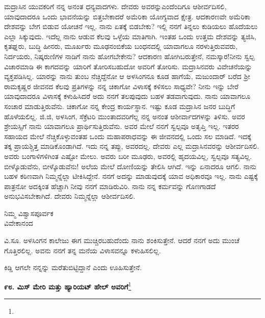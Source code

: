 ಮದ್ರಾಸಿನ ಯುವಕರಿಗೆ ನನ್ನ ಅನಂತ ಧನ್ಯವಾದಗಳು. ದೇವರು ಅವರನ್ನು\break ಎಂದೆಂದಿಗೂ ಆಶೀರ್ವದಿಸಲಿ, ಯಾವುದಾದರೂ ಒಂದು ಭಾವನೆಯನ್ನು ಬಿತ್ತಬೇಕಾದರೆ ಅಮೆರಿಕಾ ಯೋಗ್ಯವಾದ ಕ್ಷೇತ್ರ. ಆದಕಾರಣವೇ ಅಮೆರಿಕಾ ದೇಶವನ್ನು ಬೇಗ ಬಿಡುವ ಯೋಚನೆ ಇಲ್ಲ. ನಾನು ಏತಕ್ಕೆ ಬಿಡಬೇಕು? ಇಲ್ಲಿ ನನಗೆ ತಿನ್ನಲು ಕುಡಿಯಲು ಹೊದೆಯಲು ಎಲ್ಲಾ ಸಿಕ್ಕುವುದು. ಇದೆಲ್ಲ ನಾನು ಆಡುವ ಕೆಲವು ಒಳ್ಳೆಯ ಮಾತಿಗಾಗಿ. ಇಂತಹ ಒಂದು ಉತ್ತಮ ದೇಶವನ್ನು ತ್ಯಜಿಸಿ, ಕೃತಘ್ನರು, ಬುದ್ಧಿ ಹೀನರು, ಮೂರ್ಖರು ಮೂಢನಂಬಿಕೆಯ ಬಂಧನದಲ್ಲಿ ಯಾವಾಗಲೂ ನರಳುತ್ತಿರುವವರು, ನಿರ್ದಯರು, ನಿಷ್ಕರುಣಿಗಳ ನಾಡಿಗೆ ನಾನು ಹೋಗಬೇಕೇನು? ಆದಕಾರಣ ಹೋಗಿಬರುತ್ತೇನೆ, ನಮಸ್ಕಾರ!ನೀನು ಸ್ವಲ್ಪ ವಿಚಾರಮಾಡಿ ಈ ಕಾಗದವನ್ನು ಯಾರಿಗೆ ತೋರಿಸಬಹುದೋ ಅವರಿಗೆ ತೋರಿಸು. ಮದ್ರಾಸಿನವರು ವಿವೇಚನೆಯನ್ನು ವ್ಯಕ್ತಪಡಿಸಿಲ್ಲ. ಯಾರನ್ನು ನಾನು ತುಂಬ ನೆಚ್ಚಿದ್ದೆನೋ ಆ ಅಳಸಿಂಗನೂ ಕೂಡ ಹಾಗೆಯೆ, ಮಜುಂದಾರ್ ಬರೆದ ಶ‍್ರೀ ರಾಮಕೃಷ್ಣರ ಜೀವನದ ಕೆಲವು ಪ್ರತಿಗಳನ್ನು ನನ್ನ ಚಿಕಾಗೋ ವಿಳಾಸಕ್ಕೆ ಕಳಿಸಲು ಸಾಧ್ಯವೇ? ನೀನು ಇನ್ನು ಬೇರೆ ಯಾವುದಾದರೂ ವಿಳಾಸಕ್ಕೆ ಕಳುಹಿಸಿದರೆ ಅದು ನನಗೆ ತಲಪುವುದು ಬಹಳ ತಡವಾಗುವುದು. ನಾನು ಯಾವಾಗಲೂ ಸಂಚಾರ ಮಾಡುತ್ತಿರುವೆನು. ಚಿಕಾಗೋ ನನ್ನ ಕೇಂದ್ರ ಕಾರ್ಯಸ್ಥಾನ. ಇಷ್ಟು ಕೂಡ ಮದ್ರಾಸಿನ ಜನರ ಬುದ್ಧಿಗೆ ಹೊಳೆಯಲಿಲ್ಲ. ಜಿ.ಜಿ, ಅಳಸಿಂಗ, ಸೆಕ್ರೆಟರಿ ಮುಂತಾದವರಿಗೆಲ್ಲ ನನ್ನ ಅನಂತ ಆಶೀರ್ವಾದಗಳನ್ನು ತಿಳಿಸು. ಅವರ ಶ್ರೇಯಸ್ಸಿಗೆ ನಾನು ಯಾವಾಗಲೂ ಪ್ರಾರ್ಥಿಸುತ್ತಿರುವೆನು. ಅವರ ಮೇಲೆ ನನಗೆ ಸ್ವಲ್ಪವೂ ಅತೃಪ್ತಿ ಇಲ್ಲ. ಇತರರ ಸಹಾಯದ ಮೇಲೆ ನೆಚ್ಚಿಕೊಳ್ಳುವಂತಹ ಒಂದು ಮಹಾಪರಾಧವನ್ನು ಈ ಜೀವನದಲ್ಲಿ ಒಂದು ಸಲ ಮಾಡಿದೆ. ಇದಕ್ಕೆ ತಕ್ಕ ಪ್ರಾಯಶ್ಚಿತ್ತ ಮಾಡಿಕೊಂಡಾಗಿದೆ. ಇದು ನನ್ನ ತಪ್ಪು, ಅವರದಲ್ಲ. ದೇವರು ಎಲ್ಲ ಮದ್ರಾಸಿನವರನ್ನು ಆಶೀರ್ವದಿಸಲಿ. ಅವರು ಬಂಗಾಳಿಗಳಿಗಿಂತ ಎಷ್ಟೋ ಮೇಲು. ಅವರು ಬರೀ ಮೂಢರು, ಅವರಲ್ಲಿ ಹೃದಯವಿಲ್ಲ, ಸ್ವಲ್ಪವೂ ಸತ್ಯವಿಲ್ಲ. ಬೀಳ್ಕೊಡುವೆನು, ಬೀಳ್ಕೊಡುವೆನು! ಅಲೆಯ ಮೇಲೆ ದೋಣಿಯನ್ನು ತೇಲಿಸಿ ಆಗಿದೆ. ಇನ್ನು ಏನಾದರೂ ಆಗಲಿ. ನಾನು ಬಹಳ ಕಠಿಣವಾಗಿ ನಿಮ್ಮನ್ನೆಲ್ಲಾ ಟೀಕಿಸಿದ್ದೇನೆ. ನನಗೆ ಅದನ್ನು ಮಾಡುವುದಕ್ಕೆ ಯಾವ ಅಧಿಕಾರವೂ ಇಲ್ಲ. ನಾನು ಎಷ್ಟಕ್ಕೆ ಪಾತ್ರನೋ ಅದಕ್ಕಿಂತ ಹೆಚ್ಚಾಗಿ ನೀವು ನನಗೆ ಮಾಡಿರುವಿರಿ. ನಾನು ನನ್ನ ಕರ್ಮವನ್ನು ಗೊಣಗಾಡದೆ ಅನುಭವಿಸಬೇಕಾಗಿದೆ. ದೇವರು ನಿಮ್ಮನ್ನೆಲ್ಲಾ ಆಶೀರ್ವದಿಸಲಿ.

\vspace{-0.5cm}

\begin{flushright}
ನಿಮ್ಮ ವಿಶ್ವಾಸಪೂರ್ವಕ\\ವಿವೇಕಾನಂದ
\end{flushright}

\vspace{-0.3cm}

ವಿ.ಸೂ. \enginline{-}ಅಳಸಿಂಗನ ಕಾಲೇಜು ಈಗ ಮುಚ್ಚಿರಬಹುದೆಂದು ನಾನು ಶಂಕಿಸುತ್ತೇನೆ. ಆದರೆ ನನಗೆ ಅದು ಮುಂಚೆ ಗೊತ್ತಿರಲಿಲ್ಲ. ಅವನು ನನಗೆ ತನ್ನ ಮನೆಯ ವಿಳಾಸವನ್ನೂ ಕಳುಹಿಸಲಿಲ್ಲ.

ಕಿಡ್ಡಿ ಆಗಲೇ ನನ್ನನ್ನು ಮರೆತುಬಿಟ್ಟಿದ್ದಾನೆ ಎಂದು ಊಹಿಸುತ್ತೇನೆ.

\vfill\eject

\begin{center}
\textbf{೯೮. ಮಿಸ್ ಮೇರಿ ಮತ್ತು ಹ್ಯಾರಿಯಟ್ ಹೇಲ್‌ ಅವರಿಗೆ}\footnote{}
\end{center}

